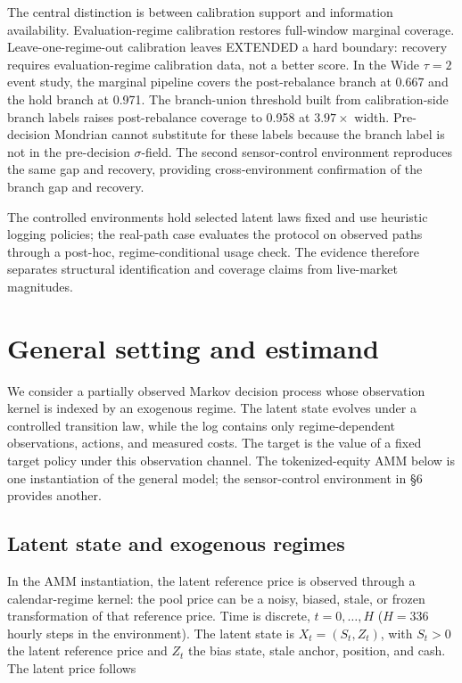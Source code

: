 The central distinction is between calibration support and information availability. Evaluation-regime calibration restores full-window marginal coverage. Leave-one-regime-out calibration leaves EXTENDED a hard boundary: recovery requires evaluation-regime calibration data, not a better score. In the Wide $\tau=2$ event study, the marginal pipeline covers the post-rebalance branch at 0.667 and the hold branch at 0.971. The branch-union threshold built from calibration-side branch labels raises post-rebalance coverage to 0.958 at $3.97\times$ width. Pre-decision Mondrian cannot substitute for these labels because the branch label is not in the pre-decision $\sigma$-field. The second sensor-control environment reproduces the same gap and recovery, providing cross-environment confirmation of the branch gap and recovery.

The controlled environments hold selected latent laws fixed and use heuristic logging policies; the real-path case evaluates the protocol on observed paths through a post-hoc, regime-conditional usage check. The evidence therefore separates structural identification and coverage claims from live-market magnitudes.

\section{General setting and estimand}

We consider a partially observed Markov decision process whose observation kernel is indexed by an exogenous regime. The latent state evolves under a controlled transition law, while the log contains only regime-dependent observations, actions, and measured costs. The target is the value of a fixed target policy under this observation channel. The tokenized-equity AMM below is one instantiation of the general model; the sensor-control environment in \S6 provides another.

\subsection{Latent state and exogenous regimes}

In the AMM instantiation, the latent reference price is observed through a calendar-regime kernel: the pool price can be a noisy, biased, stale, or frozen transformation of that reference price. Time is discrete, $t=0,\dots,H$ ($H=336$ hourly steps in the environment). The latent state is $X_t=(S_t,Z_t)$, with $S_t>0$ the latent reference price and $Z_t$ the bias state, stale anchor, position, and cash. The latent price follows

